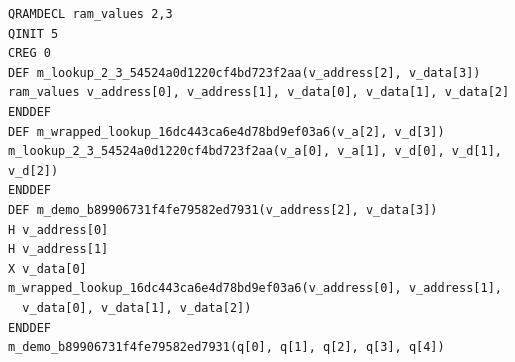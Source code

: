 \begin{lstlisting}[style=pyqir, caption={OriginIR-ext export of a nested QRAM-lookup program (verbatim from the repository's example artifacts).  \texttt{DEF} blocks, module calls, and the \texttt{QRAMDECL} resource are preserved; no call is inlined.  Content hashes in definition names make exports deterministic and diff-stable.}, label={lst:originir}]
QRAMDECL ram_values 2,3
QINIT 5
CREG 0
DEF m_lookup_2_3_54524a0d1220cf4bd723f2aa(v_address[2], v_data[3])
ram_values v_address[0], v_address[1], v_data[0], v_data[1], v_data[2]
ENDDEF
DEF m_wrapped_lookup_16dc443ca6e4d78bd9ef03a6(v_a[2], v_d[3])
m_lookup_2_3_54524a0d1220cf4bd723f2aa(v_a[0], v_a[1], v_d[0], v_d[1], v_d[2])
ENDDEF
DEF m_demo_b89906731f4fe79582ed7931(v_address[2], v_data[3])
H v_address[0]
H v_address[1]
X v_data[0]
m_wrapped_lookup_16dc443ca6e4d78bd9ef03a6(v_address[0], v_address[1],
  v_data[0], v_data[1], v_data[2])
ENDDEF
m_demo_b89906731f4fe79582ed7931(q[0], q[1], q[2], q[3], q[4])
\end{lstlisting}

